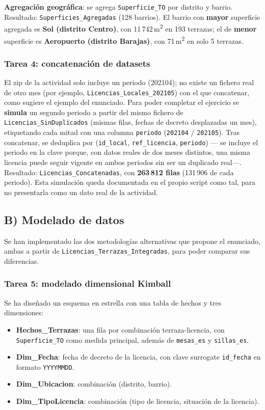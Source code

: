 \documentclass[11pt]{article}
\begin{document}
\textbf{Agregación geográfica}: se agrega \texttt{Superficie\_TO} por distrito y barrio.
Resultado: \texttt{Superficies\_Agregadas} (128 barrios). El barrio con \textbf{mayor}
superficie agregada es \textbf{Sol (distrito Centro)}, con 11\,742\,m\textsuperscript{2} en
193 terrazas; el de \textbf{menor} superficie es \textbf{Aeropuerto (distrito Barajas)},
con 71\,m\textsuperscript{2} en solo 5 terrazas.

\subsubsection{Tarea 4: concatenación de datasets}

El zip de la actividad solo incluye un periodo (202104); no existe un fichero real de otro
mes (por ejemplo, \texttt{Licencias\_Locales\_202105}) con el que concatenar, como sugiere
el ejemplo del enunciado. Para poder completar el ejercicio se \textbf{simula} un segundo
periodo a partir del mismo fichero de \texttt{Licencias\_SinDuplicados} (mismas filas,
fechas de decreto desplazadas un mes), etiquetando cada mitad con una columna
\texttt{periodo} (\texttt{202104} / \texttt{202105}). Tras concatenar, se deduplica por
(\texttt{id\_local}, \texttt{ref\_licencia}, \texttt{periodo}) --- se incluye el periodo en
la clave porque, con datos reales de dos meses distintos, una misma licencia puede seguir
vigente en ambos periodos sin ser un duplicado real---. Resultado:
\texttt{Licencias\_Concatenadas}, con \textbf{263\,812 filas} (131\,906 de cada periodo).
Esta simulación queda documentada en el propio script como tal, para no presentarla como
un dato real de la actividad.

\subsection{B) Modelado de datos}

Se han implementado las dos metodologías alternativas que propone el enunciado, ambas a
partir de \texttt{Licencias\_Terrazas\_Integradas}, para poder comparar sus diferencias.

\subsubsection{Tarea 5: modelado dimensional Kimball}

Se ha diseñado un esquema en estrella con una tabla de hechos y tres dimensiones:

\begin{itemize}[nosep]
    \item \textbf{Hechos\_Terrazas}: una fila por combinación terraza-licencia, con
    \texttt{Superficie\_TO} como medida principal, además de \texttt{mesas\_es} y
    \texttt{sillas\_es}.
    \item \textbf{Dim\_Fecha}: fecha de decreto de la licencia, con clave surrogate
    \texttt{id\_fecha} en formato \texttt{YYYYMMDD}.
    \item \textbf{Dim\_Ubicacion}: combinación (distrito, barrio).
    \item \textbf{Dim\_TipoLicencia}: combinación (tipo de licencia, situación de la licencia).
\end{itemize}
\end{document}
